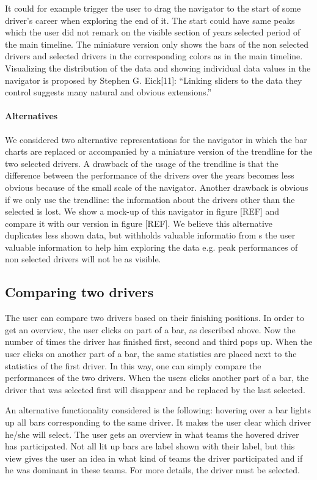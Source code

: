 \documentclass{sigchi}
\begin{document}
It could for example trigger the user to drag the navigator to the start of some driver’s career when exploring the end of it. The start could have same peaks which the user did not remark on the visible section of years selected period of the main timeline. The miniature version only shows the bars of the non selected drivers and selected drivers in the corresponding colors as in the main timeline. Visualizing the distribution of the data and showing individual data values in the navigator is proposed by Stephen G. Eick[11]: “Linking sliders to the data they control suggests many natural and obvious extensions.”


\paragraph{Alternatives}
We considered two alternative representations for the navigator in which the bar charts are replaced or accompanied by a miniature version of the trendline for the two selected drivers. A drawback of the usage of the trendline is that the difference between the performance of the drivers over the years becomes less obvious because of the small scale of the navigator. Another drawback is obvious if we only use the trendline: the information about the drivers other than the selected is lost.
 We show a mock-up of this navigator in figure [REF] and compare it with our version in figure [REF]. We believe this alternative duplicates less shown data, but withholds valuable informatio from s the user  valuable information to help him exploring the data e.g. peak performances of non selected drivers will not be as visible.


\subsection{Comparing two drivers}
The user can compare two drivers based on their finishing positions. In order to get an overview, the user clicks on part of a bar, as described above. Now the number of times the driver has finished first, second and third pops up. When the user clicks on another part of a bar, the same statistics are placed next to the statistics of the first driver. In this way, one can simply compare the performances of the two drivers. When the users clicks another part of a bar, the driver that was selected first will disappear and be replaced by the last selected.

An alternative functionality considered is the following: hovering over a bar lights up all bars corresponding to the same driver. It makes the user clear which driver he/she will select. The user gets an overview in what teams the hovered driver has participated. Not all lit up bars are label shown with their label, but this view gives the user an idea in what kind of teams the driver participated and if he was dominant in these teams. For more details, the driver must be selected.
\end{document}
